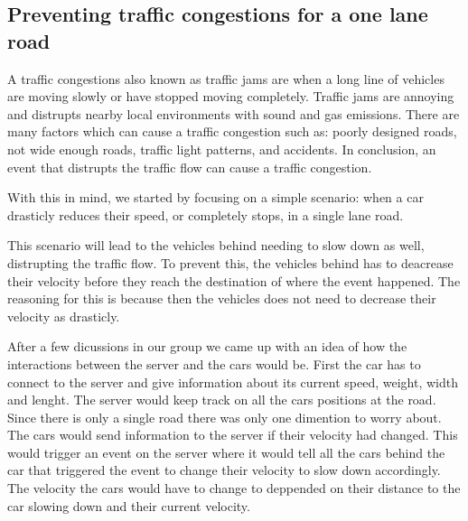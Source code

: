 \subsection{Preventing traffic congestions for a one lane road}

A traffic congestions also known as traffic jams are when a long line of vehicles are moving slowly or have stopped moving completely. Traffic jams are annoying and distrupts nearby local environments with sound and gas emissions. There are many factors which can cause a traffic congestion such as:
poorly designed roads, not wide enough roads, traffic light patterns, and accidents. In conclusion, an event that distrupts the traffic flow can cause a traffic congestion.

With this in mind, we started by focusing on a simple scenario: when a car drasticly reduces their speed, or completely stops, in a single lane road. 

This scenario will lead to the vehicles behind needing to slow down as well, distrupting the traffic flow. To prevent this, the vehicles behind has to deacrease their velocity before they reach the destination of where the event happened. The reasoning for this is because then the vehicles does not need to decrease their velocity as drasticly. 

After a few dicussions in our group we came up with an idea of how the interactions between the server and the cars would be. First the car has to connect to the server and give information about its current speed, weight, width and lenght. The server would keep track on all the cars positions at the road. Since there is only a single road there was only one dimention to worry about. The cars would send information to the server if their velocity had changed. This would trigger an event on the server where it would tell all the cars behind the car that triggered the event to change their velocity to slow down accordingly. The velocity the cars would have to change to deppended on their distance to the car slowing down and their current velocity.       